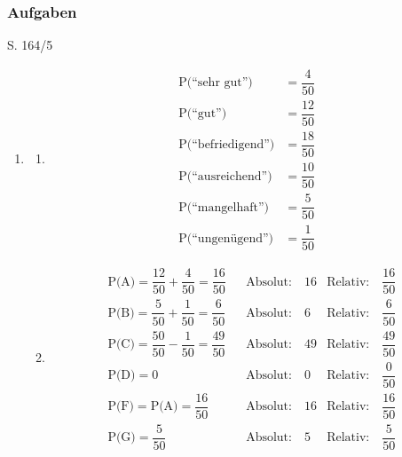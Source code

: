 
\subsubsection{Aufgaben}

\begin{Exercise}{S. 164/5}{}
\begin{enumerate}[leftmargin=*]
    \item [5.]\begin{enumerate}[label=\alph*),leftmargin=*]
        \item[a)] {
            \begin{align*}
                &\text{P(``sehr gut'')} &= \dfrac{4}{50} &&\\[1.5ex]
                &\text{P(``gut'')} &= \dfrac{12}{50} &&\\[1.5ex]
                &\text{P(``befriedigend'')} &= \dfrac{18}{50} &&\\[1.5ex]
                &\text{P(``ausreichend'')} &= \dfrac{10}{50} &&\\[1.5ex]
                &\text{P(``mangelhaft'')} &= \dfrac{5}{50} &&\\[1.5ex]
                &\text{P(``ungenügend'')} &= \dfrac{1}{50} &&
            \end{align*}
            }
        \item [b)] {
            \begin{align*}
                &\text{P(A)} = \dfrac{12}{50} + \dfrac{4}{50} = \dfrac{16}{50} &&\text{Absolut:}\quad 16 &\text{Relativ:}\quad \dfrac{16}{50} &\\[1.5ex]
                &\text{P(B)} = \dfrac{5}{50} + \dfrac{1}{50} = \dfrac{6}{50} &&\text{Absolut:}\quad 6 &\text{Relativ:}\quad \dfrac{6}{50} &\\[1.5ex]
                &\text{P(C)} = \dfrac{50}{50} - \dfrac{1}{50} = \dfrac{49}{50} &&\text{Absolut:}\quad 49 &\text{Relativ:}\quad \dfrac{49}{50} &\\[1.5ex]  
                &\text{P(D)} = 0 &&\text{Absolut:}\quad 0 &\text{Relativ:}\quad \dfrac{0}{50} &\\[1.5ex]
                &\text{P(F)} = \text{P(A)} = \dfrac{16}{50} &&\text{Absolut:}\quad 16 &\text{Relativ:}\quad \dfrac{16}{50} &\\[1.5ex]
                &\text{P(G)} = \dfrac{5}{50} &&\text{Absolut:}\quad 5 &\text{Relativ:}\quad \dfrac{5}{50} &
            \end{align*}
            }
    \end{enumerate}
\end{enumerate}
\end{Exercise}

